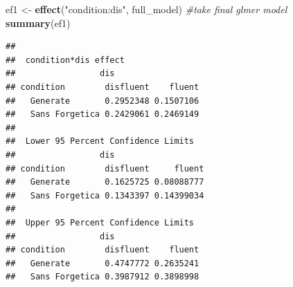 \documentclass[pdf]{apa6}
\newenvironment{Shaded}{\begin{snugshade}}{\end{snugshade}}
\newcommand{\CommentTok}[1]{\textcolor[rgb]{0.56,0.35,0.01}{\textit{#1}}}
\newcommand{\KeywordTok}[1]{\textcolor[rgb]{0.13,0.29,0.53}{\textbf{#1}}}
\newcommand{\NormalTok}[1]{#1}
\newcommand{\StringTok}[1]{\textcolor[rgb]{0.31,0.60,0.02}{#1}}
\begin{document}
\begin{Shaded}
\begin{Highlighting}[]
\NormalTok{ef1 <-}\StringTok{ }\KeywordTok{effect}\NormalTok{(}\StringTok{"condition:dis"}\NormalTok{, full_model) }\CommentTok{#take final glmer model }
\KeywordTok{summary}\NormalTok{(ef1)}
\end{Highlighting}
\end{Shaded}

\begin{verbatim}
## 
##  condition*dis effect
##                 dis
## condition        disfluent    fluent
##   Generate       0.2952348 0.1507106
##   Sans Forgetica 0.2429061 0.2469149
## 
##  Lower 95 Percent Confidence Limits
##                 dis
## condition        disfluent     fluent
##   Generate       0.1625725 0.08088777
##   Sans Forgetica 0.1343397 0.14399034
## 
##  Upper 95 Percent Confidence Limits
##                 dis
## condition        disfluent    fluent
##   Generate       0.4747772 0.2635241
##   Sans Forgetica 0.3987912 0.3898998
\end{verbatim}
\end{document}
